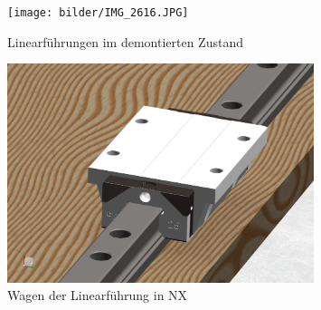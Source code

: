 \documentclass[paper=A4,pagesize,DIV=18, 12pt,listof=totoc,bibliography=totoc,headings=optiontohead,open=any]{article}
\begin{document}
\begin{figure}[H]
	\centering
	\texttt{[image: bilder/IMG\_2616.JPG]}
	\caption{Linearführungen im demontierten Zustand} 
	\label{fig:wagen}
\end{figure}

\begin{figure}[H]
	\centering
	\includegraphics[width=0.8\textwidth]{NX_Screenshots/wagen.png}
	\caption{Wagen der Linearführung in NX} 
	\label{fig:wagen_foto}
\end{figure}
\end{document}
